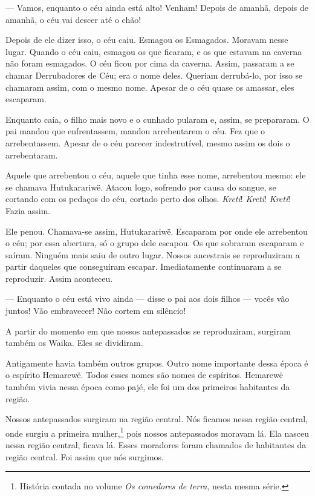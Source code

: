 --- Vamos, enquanto o céu ainda está alto! Venham! Depois de amanhã,
depois de amanhã, o céu vai descer até o chão! 

Depois de ele dizer isso, o céu caiu. Esmagou os Esmagados. Moravam
nesse lugar. Quando o céu caiu, esmagou os que ficaram, e os que estavam
na caverna não foram esmagados. O céu ficou por cima da caverna. Assim,
passaram a se chamar Derrubadores de Céu; era o nome deles. Queriam
derrubá-lo, por isso se chamaram assim, com o mesmo nome. Apesar de o
céu quase os amassar, eles escaparam. 

Enquanto caía, o filho mais novo e o cunhado pularam e, assim, se
prepararam. O pai mandou que enfrentassem, mandou arrebentarem o céu. Fez
que o arrebentassem. Apesar de o céu parecer indestrutível, mesmo assim
os dois o arrebentaram. 

Aquele que arrebentou o céu, aquele que tinha esse nome, arrebentou
mesmo: ele se chamava Hutukarariwë. Atacou logo, sofrendo por causa do
sangue, se cortando com os pedaços do céu, cortado perto dos
olhos. \textit{Kreti}! \textit{Kreti}! \textit{Kreti}! Fazia assim. 

Ele penou. Chamava-se assim, Hutukarariwë. Escaparam por onde ele
arrebentou o céu; por essa abertura, só o grupo dele escapou. Os que
sobraram escaparam e saíram. Ninguém mais saiu de outro lugar. Nossos
ancestrais se reproduziram a partir daqueles que conseguiram escapar.
Imediatamente continuaram a se reproduzir. Assim aconteceu. 

--- Enquanto o céu está vivo ainda --- disse o pai aos dois filhos ---
vocês vão juntos! Vão embravecer! Não cortem em silêncio! 

A partir do momento em que nossos antepassados se reproduziram, surgiram
também os Waika. Eles se dividiram.

Antigamente havia também outros grupos. Outro nome importante dessa
época é o espírito Hemarewë. Todos esses nomes são nomes de espíritos.
Hemarewë também vivia nessa época como pajé, ele foi um dos primeiros
habitantes da região.


Nossos antepassados surgiram na região central. Nós ficamos nessa
região central, onde surgiu a primeira mulher,\footnote{História contada no volume \textit{Os comedores de terra}, nesta mesma série.} pois nossos antepassados
moravam lá. Ela nasceu nessa região central, ficava lá. Esses moradores
foram chamados de habitantes da região central. Foi assim que nós
surgimos.

